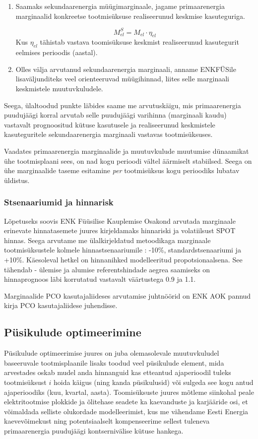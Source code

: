 \documentclass[10pt,a4paper]{article}
\begin{document}
\begin{enumerate}
\item Saamaks sekundaarenergia müügimarginaale, jagame primaarenergia marginaalid konkreetse tootmisüksuse realiseerunud keskmise kasuteguriga.

\begin{equation}
M^S_{el} = M_{el} \cdot \eta_{el}
\end{equation}
Kus $\eta_{el}$ tähistab vastava toomisüksuse keskmist realiseerunud kasutegurit eelmises perioodis (aastal).

\item Olles välja arvutanud sekundaarenergia marginaali, anname ENKFÜSile lisaväljunditeks veel orienteeruvad müügihinnad, liites selle marginaali keskmistele muutuvkuludele.

\end{enumerate}

Seega, ülaltoodud punkte läbides saame me arvutuskäigu, mis primaarenergia puudujäägi korral arvutab selle puudujäägi varihinna (marginaali kaudu) vastavalt prognoositud kütuse kasutusele ja realiseerunud keskmistele kasuteguritele sekundaarenergia marginaali vastavas tootmisüksuses.

Vaadates primaarenergia marginaalide ja muutuvkulude muutumise dü\-naami\-kat ühe tootmisplaani sees, on nad kogu perioodi vältel äärmiselt stabiilsed. Seega on ühe marginaalide taseme esitamine \emph{per} tootmisüksus kogu perioodiks lubatav üldistus.

\subsubsection{Stsenaariumid ja hinnarisk}

Lõpetuseks soovis ENK Füüsilise Kauplemise Osakond arvutada marginaale erinevate hinnatasemete juures kirjeldamaks hinnariski ja volatiilsust SPOT hinnas. Seega arvutame me ülalkirjeldatud metoodikaga marginaale tootmisüksustele kolmele hinnastsenaariumile : -10\%, standardstsenaariumi ja +10\%. Käesoleval hetkel on hinnanihked modelleeritud propotsionaalsena. See tähendab - ülemise ja alumise referentshindade aegrea saamiseks on hinnaprognoos läbi korrutatud vastavalt väärtustega 0.9 ja 1.1. 

Marginaalide PCO kasutajaliideses arvutamise juhtnöörid on ENK AOK pannud kirja PCO kasutajaliidese juhendisse.

\subsection{Püsikulude optimeerimine}
Püsikulude optimeerimise juures on juba olemasolevale muutuvkuludel baseeruvale tootmisplaanile lisaks toodud veel püsikulude element, mida arvestades oskab mudel anda hinnanguid kas etteantud ajaperioodil tuleks tootmisüksust $i$ hoida käigus (ning kanda püsikulusid) või sulgeda see kogu antud ajaperioodiks (kuu, kvartal, aasta). Toomisüksuste juures mõtleme siinkohal peale elektritootmise plokkide ja õlitehase seadete ka kaevanduste ja karjääride osi, et võimaldada selliste olukordade modelleerimist, kus me vähendame Eesti Energia kaevevõimekust ning potentsiaalselt kompenseerime sellest tuleneva primaarenergia puudujäägi kontsernivälise kütuse hankega.
\end{document}
